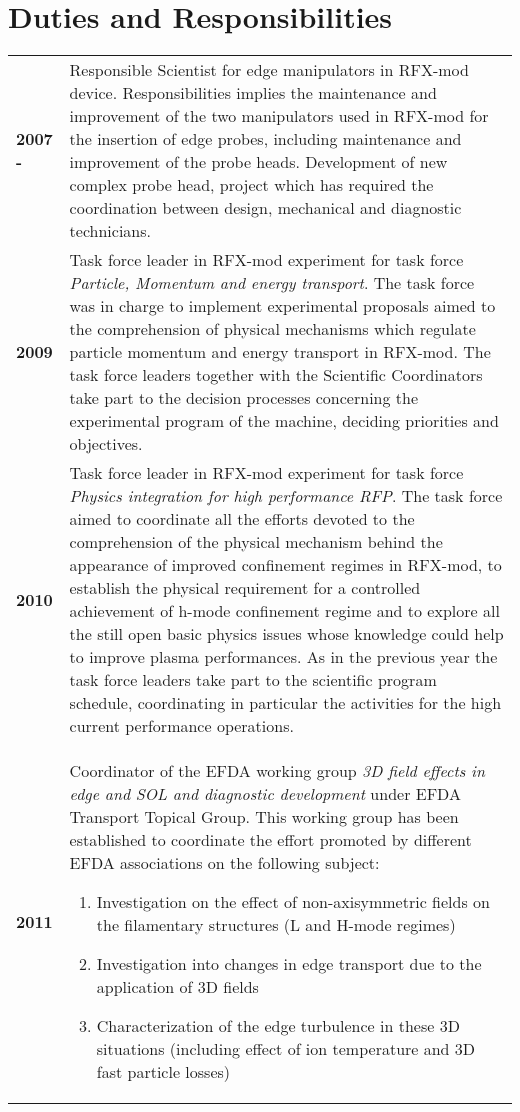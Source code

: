 \section{Duties and Responsibilities}
\begin{longtable}{>{\bfseries}l p{11cm}}
2007 -  & Responsible Scientist for edge manipulators in RFX-mod
device. Responsibilities implies the maintenance and improvement of
the two manipulators used in RFX-mod for the insertion of edge probes,
including maintenance and improvement of the probe heads. Development of new
complex probe head, project which has required the coordination
between design, mechanical and diagnostic technicians.  \\
2009 & Task force leader in RFX-mod experiment for task force
\emph{Particle, Momentum and energy transport}. The task force was in
charge to implement experimental proposals aimed to the comprehension
of physical mechanisms which regulate particle momentum and energy
transport in RFX-mod. The task force leaders together with the
Scientific Coordinators take part to the decision processes concerning
the experimental program of the machine, deciding priorities and
objectives. \\
2010 & Task force leader in RFX-mod experiment for task force
\emph{Physics integration for high performance RFP}. The task force
aimed to coordinate all the efforts devoted to the comprehension of
the physical mechanism behind the  appearance of improved confinement
regimes in RFX-mod, to establish the physical requirement for a controlled achievement  of h-mode confinement regime
and to explore all the still open basic physics issues whose knowledge
could help to improve plasma performances. As in the previous year the
task force leaders take part to the scientific program schedule,
coordinating in particular the activities for the high current
performance operations. \\
2011 & Coordinator of the EFDA working group \emph{3D field effects in
  edge and SOL and diagnostic development} under EFDA Transport
Topical Group. This working group has been established to
coordinate the effort promoted by different EFDA associations on the
following subject:
\begin{enumerate}
\item Investigation on  the effect of non-axisymmetric fields on the filamentary structures (L and H-mode regimes)
\item Investigation into changes in edge transport due to the application of 3D fields
\item Characterization of the edge turbulence in these 3D situations (including effect of ion temperature and 3D fast particle losses)

\end{enumerate}
\end{longtable}
